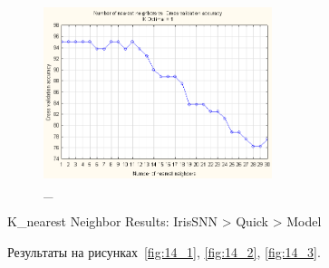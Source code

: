 \begin{figure}[!h]
  \centering

  \includegraphics[height=5cm]
  {inc/ex_14.PNG}

  \caption{\_}

  \label{fig:13}
\end{figure}



K\_nearest Neighbor Results: IrisSNN > Quick > Model

Результаты на рисунках~\ref{fig:14_1}, \ref{fig:14_2}, \ref{fig:14_3}.

